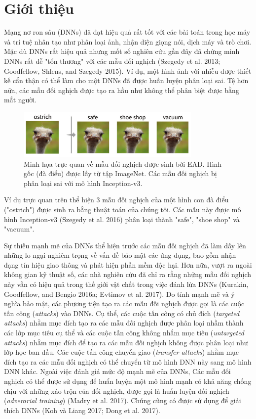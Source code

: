 \chapter{Giới thiệu}
Mạng nơ ron sâu (DNNs) đã đạt hiệu quả rất tốt với các bài toán trong học máy
và trí tuệ nhân tạo như phân loại ảnh, nhận diện giọng nói, dịch máy và trò chơi.
Mặc dù DNNs rất hiệu quả nhưng mốt số nghiên cứu gần đây đã chứng minh DNNs rất 
dễ  "tổn thương" với các mẫu đối nghịch (Szegedy et al. 2013; Goodfellow, Shlens, 
and Szegedy 2015). Ví dụ, một hình ảnh với nhiễu được thiết kế cẩn thận có thể
làm cho một DNNs đã được huấn luyện phân loại sai. Tệ hơn nữa, các mẫu đối nghịch
được tạo ra hầu như không thể phân biệt được bằng mắt người. 
\begin{figure}[H] %
    \centering %
    \includegraphics[width=0.8\textwidth]{assets/fig_01.png} 
    \caption{Minh họa trực quan về mẫu đối nghịch được sinh bởi EAD. 
    Hình gốc (đà điểu) được lấy từ tập ImageNet. Các mẫu đối nghịch bị 
    phân loại sai với mô hình Inception-v3.} %
    \label{fig:fg_01}
\end{figure}
Ví dụ trực quan trên thể hiện 3 mẫu đối nghịch của một hình con đà điểu ("ostrich") 
được sinh ra bằng thuật toán của chúng tôi. Các mẫu này được mô hình Inception-v3 
(Szegedy et al. 2016) phân loại thành "safe", "shoe shop" và "vacuum". 

Sự thiếu mạnh mẽ của DNNs thể hiện trước các mẫu đối nghịch đã làm dấy lên những lo ngại 
nghiêm trọng về vấn đề bảo mật các ứng dụng, bao gồm nhận dạng tín hiệu giao thông 
và phát hiện phần mềm độc hại. Hơn nữa, vượt ra ngoài không gian kỹ thuật số, 
các nhà nghiên cứu đã chỉ ra rằng những mẫu đối nghịch này vẫn có hiệu quả trong thế giới 
vật chất trong việc đánh lừa DNNs (Kurakin, Goodfellow, and Bengio 2016a; Evtimov et al. 2017).
Do tính mạnh mẽ và ý nghĩa bảo mật, các phương tiện tạo ra các mẫu đối nghịch được gọi là 
các cuộc tấn công (\textit{attacks}) vào DNNs. Cụ thể, các cuộc tấn công có chủ đích 
(\textit{targeted attacks}) nhằm mục đích tạo ra các mẫu đối nghịch được phân loại nhầm thành các lớp mục tiêu 
cụ thể và các cuộc tấn công không nhắm mục tiêu (\textit{untargeted attacks}) nhằm mục đích 
để tạo ra các mẫu đối nghịch không được phân loại như lớp học ban đầu. Các cuộc tấn công 
chuyển giao (\textit{transfer attacks}) nhằm mục đích tạo ra các mẫu đối nghịch có thể chuyển 
từ mô hình DNN này sang mô hình DNN khác. Ngoài việc đánh giá mức độ mạnh mẽ của DNNs,
Các mẫu đối nghịch có thể được sử dụng để huẩn luyện một mô hình mạnh có khả năng chống chịu 
với những xáo trộn của đối nghịch, được gọi là huấn luyện đối nghịch (\textit{adverarial training}) 
(Madry et al. 2017). Chúng cũng có được sử dụng để giải thích DNNs (Koh và Liang 2017;
Dong et al. 2017). 

